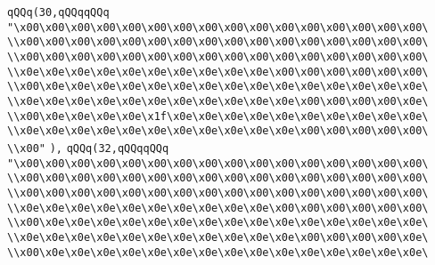 \verb|qQQq(30,qQQqqQQq|\newline
\verb|"\x00\x00\x00\x00\x00\x00\x00\x00\x00\x00\x00\x00\x00\x00\x00\x00\|\newline
\verb|\\x00\x00\x00\x00\x00\x00\x00\x00\x00\x00\x00\x00\x00\x00\x00\x00\|\newline
\verb|\\x00\x00\x00\x00\x00\x00\x00\x00\x00\x00\x00\x00\x00\x00\x00\x00\|\newline
\verb|\\x0e\x0e\x0e\x0e\x0e\x0e\x0e\x0e\x0e\x0e\x00\x00\x00\x00\x00\x00\|\newline
\verb|\\x00\x0e\x0e\x0e\x0e\x0e\x0e\x0e\x0e\x0e\x0e\x0e\x0e\x0e\x0e\x0e\|\newline
\verb|\\x0e\x0e\x0e\x0e\x0e\x0e\x0e\x0e\x0e\x0e\x0e\x00\x00\x00\x00\x0e\|\newline
\verb|\\x00\x0e\x0e\x0e\x0e\x1f\x0e\x0e\x0e\x0e\x0e\x0e\x0e\x0e\x0e\x0e\|\newline
\verb|\\x0e\x0e\x0e\x0e\x0e\x0e\x0e\x0e\x0e\x0e\x0e\x00\x00\x00\x00\x00\|\newline
\verb|\\x00"|\newline
\verb|),|\newline
\verb|qQQq(32,qQQqqQQq|\newline
\verb|"\x00\x00\x00\x00\x00\x00\x00\x00\x00\x00\x00\x00\x00\x00\x00\x00\|\newline
\verb|\\x00\x00\x00\x00\x00\x00\x00\x00\x00\x00\x00\x00\x00\x00\x00\x00\|\newline
\verb|\\x00\x00\x00\x00\x00\x00\x00\x00\x00\x00\x00\x00\x00\x00\x00\x00\|\newline
\verb|\\x0e\x0e\x0e\x0e\x0e\x0e\x0e\x0e\x0e\x0e\x00\x00\x00\x00\x00\x00\|\newline
\verb|\\x00\x0e\x0e\x0e\x0e\x0e\x0e\x0e\x0e\x0e\x0e\x0e\x0e\x0e\x0e\x0e\|\newline
\verb|\\x0e\x0e\x0e\x0e\x0e\x0e\x0e\x0e\x0e\x0e\x0e\x00\x00\x00\x00\x0e\|\newline
\verb|\\x00\x0e\x0e\x0e\x0e\x0e\x0e\x0e\x0e\x0e\x0e\x0e\x0e\x0e\x0e\x0e\|\newline
